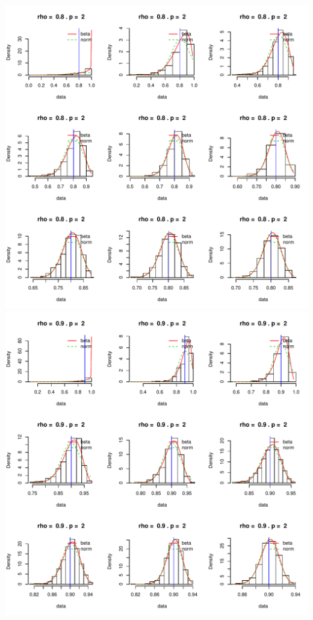 \documentclass[]{article}
\begin{document}
\includegraphics{2016_w09_files/figure-latex/unnamed-chunk-14-9.pdf}
\includegraphics{2016_w09_files/figure-latex/unnamed-chunk-14-10.pdf}
\end{document}
